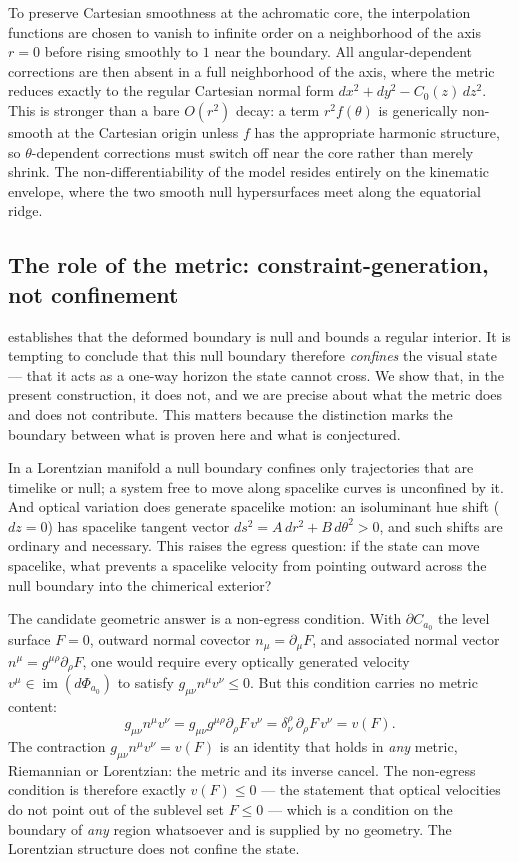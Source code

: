 \documentclass[preprint,12pt,authoryear]{elsarticle}
\theoremstyle{plain}
\theoremstyle{definition}
\theoremstyle{remark}
\begin{document}
To preserve Cartesian smoothness at the achromatic core, the interpolation functions are chosen to vanish to infinite order on a neighborhood of the axis $r=0$ before rising smoothly to $1$ near the boundary. All angular-dependent corrections are then absent in a full neighborhood of the axis, where the metric reduces exactly to the regular Cartesian normal form $dx^2+dy^2-C_0(z)\,dz^2$. This is stronger than a bare $O(r^2)$ decay: a term $r^2 f(\theta)$ is generically non-smooth at the Cartesian origin unless $f$ has the appropriate harmonic structure, so $\theta$-dependent corrections must switch off near the core rather than merely shrink. The non-differentiability of the model resides entirely on the kinematic envelope, where the two smooth null hypersurfaces meet along the equatorial ridge.

\subsection{The role of the metric: constraint-generation, not confinement}
\label{subsec:envelope-kinematic-confinement}

 establishes that the deformed boundary is null and bounds a regular interior. It is tempting to conclude that this null boundary therefore \emph{confines} the visual state --- that it acts as a one-way horizon the state cannot cross. We show that, in the present construction, it does not, and we are precise about what the metric does and does not contribute. This matters because the distinction marks the boundary between what is proven here and what is conjectured.

In a Lorentzian manifold a null boundary confines only trajectories that are timelike or null; a system free to move along spacelike curves is unconfined by it. And optical variation does generate spacelike motion: an isoluminant hue shift ($dz=0$) has spacelike tangent vector $ds^2=A\,dr^2+B\,d\theta^2>0$, and such shifts are ordinary and necessary. This raises the egress question: if the state can move spacelike, what prevents a spacelike velocity from pointing outward across the null boundary into the chimerical exterior?

The candidate geometric answer is a non-egress condition. With $\partial C_{a_0}$ the level surface $F=0$, outward normal covector $n_\mu=\partial_\mu F$, and associated normal vector $n^\mu=g^{\mu\rho}\partial_\rho F$, one would require every optically generated velocity $v^\mu\in\operatorname{im}(d\Phi_{a_0})$ to satisfy $g_{\mu\nu}n^\mu v^\nu\leq 0$. But this condition carries no metric content:
\[
g_{\mu\nu}n^\mu v^\nu
=g_{\mu\nu}g^{\mu\rho}\partial_\rho F\,v^\nu
=\delta_\nu^\rho\,\partial_\rho F\,v^\nu
=v(F).
\]
The contraction $g_{\mu\nu}n^\mu v^\nu=v(F)$ is an identity that holds in \emph{any} metric, Riemannian or Lorentzian: the metric and its inverse cancel. The non-egress condition is therefore exactly $v(F)\leq 0$ --- the statement that optical velocities do not point out of the sublevel set $F\leq 0$ --- which is a condition on the boundary of \emph{any} region whatsoever and is supplied by no geometry. The Lorentzian structure does not confine the state.
\end{document}
